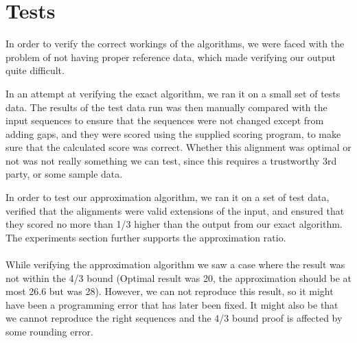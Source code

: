 \section{Tests}
In order to verify the correct workings of the algorithms, we were faced with the problem of not having proper reference data, which made verifying our output quite difficult.

In an attempt at verifying the exact algorithm, we ran it on a small set of tests data. The results of the test data run was then manually compared with the input sequences to ensure that the sequences were not changed except from adding gaps, and they were scored using the supplied scoring program, to make sure that the calculated score was correct. Whether this alignment was optimal or not was not really something we can test, since this requires a trustworthy 3rd party, or some sample data.

In order to test our approximation algorithm, we ran it on a set of test data, verified that the alignments were valid extensions of the input, and ensured that they scored no more than 1/3 higher than the output from our exact algorithm. The experiments section further supports the approximation ratio.

\paragraph{}
While verifying the approximation algorithm we saw a case where
the result was not within the 4/3 bound (Optimal result was 20,
the approximation should be at most 26.6 but was 28). However, we
can not reproduce this result, so it might have been a
programming error that has later been fixed. It might also be
that we cannot reproduce the right sequences and the 4/3 bound
proof is affected by some rounding error.
